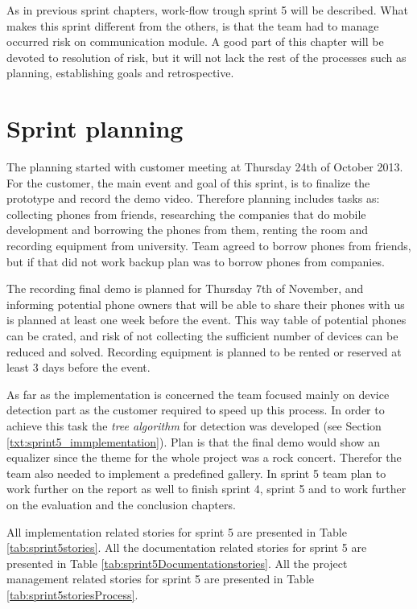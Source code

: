 \label{chap:sprint5}
As in previous sprint chapters, work-flow trough sprint 5 will be described. What makes this sprint different from the others, is that the team had to manage occurred risk on communication module. A good part of this chapter will be devoted to resolution of risk, but it will not lack the rest of the processes such as planning, establishing goals and retrospective.

\section{Sprint planning}

The planning started with customer meeting at Thursday 24th of October 2013. For the customer, the main event and goal of this sprint, is to finalize the prototype and record the demo video. Therefore planning includes tasks as: collecting phones from friends, researching the companies that do mobile development and borrowing the phones from them, renting the room and recording equipment from university. Team agreed to borrow phones from friends, but if that did not work backup plan was to borrow phones from companies.

The recording final demo is planned for Thursday 7th of November, and informing potential phone owners that will be able to share their phones with us is planned at least one week before the event. This way table of potential phones can be crated, and risk of not collecting the sufficient number of devices can be reduced and solved. Recording equipment is planned to be rented or reserved at least 3 days before the event.

As far as the implementation is concerned the team focused mainly on device detection part as the customer required to speed up this process. In order to achieve this task the \textit{tree algorithm} for detection was developed (see Section \ref{txt:sprint5_immplementation}). Plan is that the final demo would show an equalizer since the theme for the whole project was a rock concert. Therefor the team also needed to implement a predefined gallery.
In sprint 5 team plan to work further on the report as well to finish sprint 4, sprint 5 and to work further on the evaluation and the conclusion chapters.  

All implementation related stories for sprint 5 are presented in Table \ref{tab:sprint5stories}.
 All the documentation related stories for sprint 5 are presented in Table \ref{tab:sprint5Documentationstories}.
 All the project management related stories for sprint 5 are presented in Table \ref{tab:sprint5storiesProcess}.


